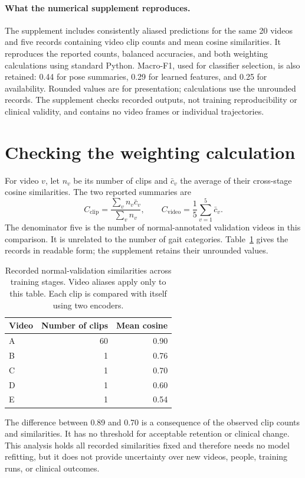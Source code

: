 \documentclass{article}
\begin{document}
\paragraph{What the numerical supplement reproduces.}
The supplement includes consistently aliased predictions for the same 20 videos and five records containing video clip counts and mean cosine similarities. It reproduces the reported counts, balanced accuracies, and both weighting calculations using standard Python. Macro-F1, used for classifier selection, is also retained: 0.44 for pose summaries, 0.29 for learned features, and 0.25 for availability. Rounded values are for presentation; calculations use the unrounded records. The supplement checks recorded outputs, not training reproducibility or clinical validity, and contains no video frames or individual trajectories.

\section{Checking the weighting calculation}
\label{app:weighting}

For video $v$, let $n_v$ be its number of clips and $\bar c_v$ the average of their cross-stage cosine similarities. The two reported summaries are
\[
C_{\mathrm{clip}}=\frac{\sum_v n_v\bar c_v}{\sum_v n_v},
\qquad
C_{\mathrm{video}}=\frac{1}{5}\sum_{v=1}^{5}\bar c_v.
\]
The denominator five is the number of normal-annotated validation videos in this comparison. It is unrelated to the number of gait categories. Table~\ref{tab:weighting_details} gives the records in readable form; the supplement retains their unrounded values.

\begin{table}[h]
\centering
\caption{Recorded normal-validation similarities across training stages. Video aliases apply only to this table. Each clip is compared with itself using two encoders.}
\label{tab:weighting_details}
\begin{tabular}{lrr}
\toprule
Video & Number of clips & Mean cosine\\
\midrule
A & 60 & 0.90\\
B & 1 & 0.76\\
C & 1 & 0.70\\
D & 1 & 0.60\\
E & 1 & 0.54\\
\bottomrule
\end{tabular}
\end{table}

The difference between 0.89 and 0.70 is a consequence of the observed clip counts and similarities. It has no threshold for acceptable retention or clinical change. This analysis holds all recorded similarities fixed and therefore needs no model refitting, but it does not provide uncertainty over new videos, people, training runs, or clinical outcomes.
\end{document}
